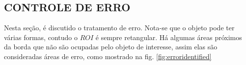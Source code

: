 \subsection{CONTROLE DE ERRO}

Nesta seção, é discutido o tratamento de erro. Nota-se que o objeto pode ter várias formas, contudo
o $ROI$ é sempre retangular. Há algumas áreas próximos da borda que não são ocupadas pelo objeto de interesse,
assim elas são consideradas áreas de erro, como mostrado na fig. \ref{fig:erroridentified}


